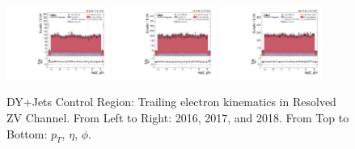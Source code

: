 \begin{figure}[!ht]
  \includegraphics[width=0.30\textwidth]{analysis_plots/2016_zjj/cr_vjets_e/lep2_phi.pdf}
  \includegraphics[width=0.30\textwidth]{analysis_plots/2017_zjj/cr_vjets_e/lep2_phi.pdf}
  \includegraphics[width=0.30\textwidth]{analysis_plots/2018_zjj/cr_vjets_e/lep2_phi.pdf} \\
  \caption[DY+Jets Control Region: Trailing electron kinematics in Resolved ZV Channel]%
  {DY+Jets Control Region: Trailing electron kinematics in Resolved ZV Channel. From Left to Right: 2016,
    2017, and 2018. From Top to Bottom: \( p_T \), \( \eta \), \( \phi \).}%
  \label{fig:zjj-cr-vjets-e-lep2-pt-eta-phi}
\end{figure}

